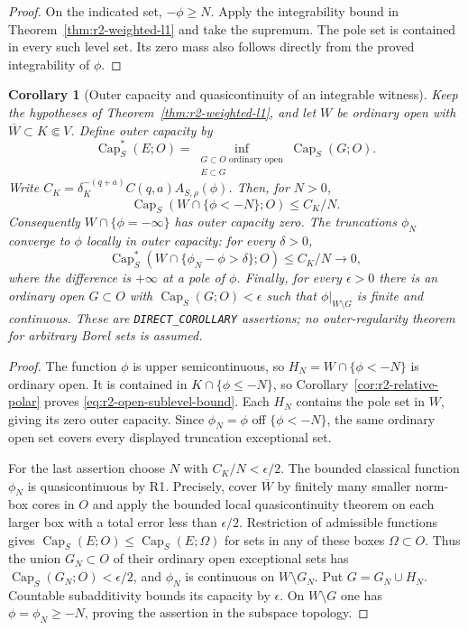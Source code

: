 \documentclass[11pt,a4paper]{article}
\numberwithin{equation}{section}
\newtheorem{corollary}[theorem]{Corollary}
\theoremstyle{definition}
\theoremstyle{remark}
\begin{document}
\begin{proof}
On the indicated set, $-\phi\geq N$. Apply the integrability
bound in Theorem~\ref{thm:r2-weighted-l1} and take the supremum.
The pole set is contained in every such level set. Its zero mass
also follows directly from the proved integrability of $\phi$.
\end{proof}

\begin{corollary}[Outer capacity and quasicontinuity of an integrable witness]
\label{cor:r2-witness-outer-capacity}
Keep the hypotheses of Theorem~\ref{thm:r2-weighted-l1}, and let
$W$ be ordinary open with $\overline W\subset K\Subset V$.
Define outer capacity by
\[
 \operatorname{Cap}_S^*(E;O)
  =\inf_{\substack{G\subset O\text{ ordinary open}\\E\subset G}}
                  \operatorname{Cap}_S(G;O).
\]
Write $C_K=\delta_K^{-(q+a)}C(q,a)A_{S,\rho}(\phi)$.
Then, for $N>0$,
\begin{equation}
\label{eq:r2-open-sublevel-bound}
 \operatorname{Cap}_S(W\cap\{\phi<-N\};O)\leq C_K/N.
\end{equation}
Consequently $W\cap\{\phi=-\infty\}$ has outer capacity zero.
The truncations $\phi_N$ converge to $\phi$ locally in outer
capacity: for every $\delta>0$,
\[
 \operatorname{Cap}_S^*
       (W\cap\{\phi_N-\phi>\delta\};O)\leq C_K/N
                  \longrightarrow0,
\]
where the difference is $+\infty$ at a pole of $\phi$.
Finally, for every $\epsilon>0$ there is an ordinary open
$G\subset O$ with $\operatorname{Cap}_S(G;O)<\epsilon$ such
that $\phi|_{W\setminus G}$ is finite and continuous.
These are \texttt{DIRECT\_COROLLARY} assertions; no outer-regularity
theorem for arbitrary Borel sets is assumed.
\end{corollary}

\begin{proof}
The function $\phi$ is upper semicontinuous, so
$H_N=W\cap\{\phi<-N\}$ is ordinary open. It is contained in
$K\cap\{\phi\leq-N\}$, so
Corollary~\ref{cor:r2-relative-polar} proves
\eqref{eq:r2-open-sublevel-bound}. Each $H_N$ contains the pole
set in $W$, giving its zero outer capacity. Since $\phi_N=\phi$
off $\{\phi<-N\}$, the same ordinary open set covers every
displayed truncation exceptional set.

For the last assertion choose $N$ with $C_K/N<\epsilon/2$.
The bounded classical function $\phi_N$ is quasicontinuous by R1.
Precisely, cover $\overline W$ by finitely many smaller norm-box
cores in $O$ and apply the bounded local quasicontinuity theorem
on each larger box with a total error less than $\epsilon/2$.
Restriction of admissible functions gives
$\operatorname{Cap}_S(E;O)\leq\operatorname{Cap}_S(E;\Omega)$
for sets in any of these boxes $\Omega\subset O$. Thus the union
$G_N\subset O$ of their ordinary open exceptional sets has
$\operatorname{Cap}_S(G_N;O)<\epsilon/2$, and $\phi_N$ is
continuous on $W\setminus G_N$. Put $G=G_N\cup H_N$.
Countable subadditivity bounds its capacity by $\epsilon$.
On $W\setminus G$ one has $\phi=\phi_N\geq-N$, proving
the assertion in the subspace topology.
\end{proof}
\end{document}
